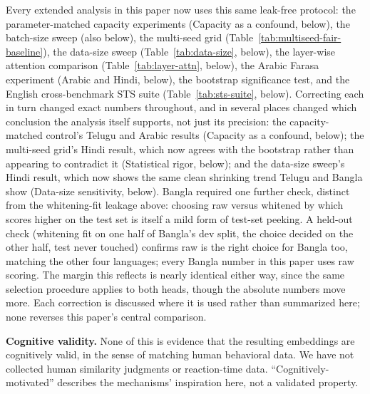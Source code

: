 \documentclass[manuscript]{acmart}
\begin{document}
Every extended analysis in this paper now uses this same leak-free protocol: the parameter-matched capacity experiments (Capacity as a confound, below), the batch-size sweep (also below), the multi-seed grid (Table~\ref{tab:multiseed-fair-baseline}), the data-size sweep (Table~\ref{tab:data-size}, below), the layer-wise attention comparison (Table~\ref{tab:layer-attn}, below), the Arabic Farasa experiment (Arabic and Hindi, below), the bootstrap significance test, and the English cross-benchmark STS suite (Table~\ref{tab:sts-suite}, below). Correcting each in turn changed exact numbers throughout, and in several places changed which conclusion the analysis itself supports, not just its precision: the capacity-matched control's Telugu and Arabic results (Capacity as a confound, below); the multi-seed grid's Hindi result, which now agrees with the bootstrap rather than appearing to contradict it (Statistical rigor, below); and the data-size sweep's Hindi result, which now shows the same clean shrinking trend Telugu and Bangla show (Data-size sensitivity, below). Bangla required one further check, distinct from the whitening-fit leakage above: choosing raw versus whitened by which scores higher on the test set is itself a mild form of test-set peeking. A held-out check (whitening fit on one half of Bangla's dev split, the choice decided on the other half, test never touched) confirms raw is the right choice for Bangla too, matching the other four languages; every Bangla number in this paper uses raw scoring. The margin this reflects is nearly identical either way, since the same selection procedure applies to both heads, though the absolute numbers move more. Each correction is discussed where it is used rather than summarized here; none reverses this paper's central comparison.

\textbf{Cognitive validity.} None of this is evidence that the resulting embeddings are cognitively valid, in the sense of matching human behavioral data. We have not collected human similarity judgments or reaction-time data. ``Cognitively-motivated'' describes the mechanisms' inspiration here, not a validated property.
\end{document}
